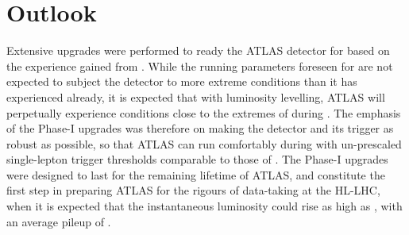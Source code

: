 \documentclass[cernpreprint, atlasdraft=false, UKenglish,british,orcidlogo, texmf, orcidlogo]{atlasdoc}
\begin{document}

\clearpage
\newpage
 
\section{Outlook} 
\label{sec:Outlook}
 

Extensive upgrades were performed to ready the ATLAS detector for \RunThr based on the experience gained from \RunOneTwo.
While the running parameters foreseen for \RunThr are not expected to subject the detector to more extreme conditions than it has experienced already, it is expected that with luminosity levelling, ATLAS will perpetually experience conditions close to the extremes of \RunOneTwo during \RunThr.
The emphasis of the Phase-I upgrades was therefore on making the detector and its trigger as robust as possible, so that ATLAS can run comfortably during \RunThr with un-prescaled single-lepton trigger thresholds comparable to those of \RunOne. The Phase-I upgrades were designed to last for the remaining lifetime of ATLAS, and constitute the first step in preparing ATLAS for the rigours of data-taking at the \gls{HL-LHC}, when it is expected that the instantaneous luminosity could rise as high as \lumihllhchigh, with an average pileup of \muhllhc.
 
 
 
\end{document}
